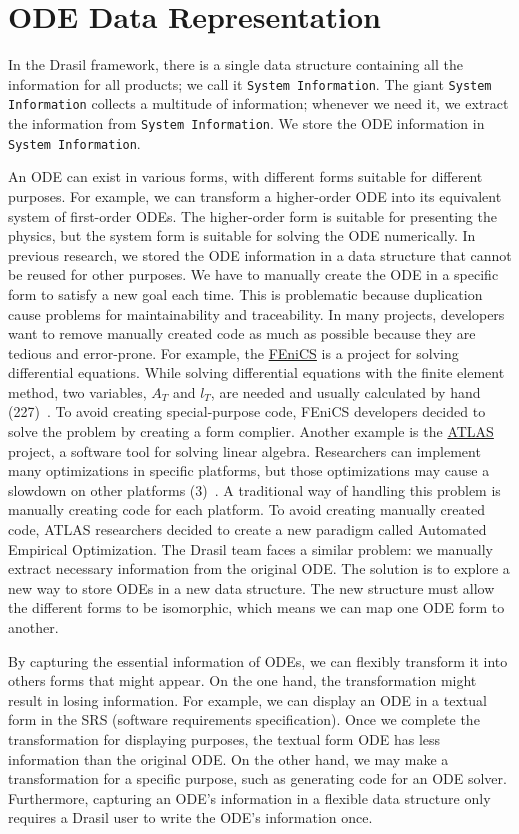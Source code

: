 \chapter{ODE Data Representation}
In the Drasil framework, there is a single data structure containing all the information for all products; we call it \verb|System Information|. The giant \verb|System Information| collects a multitude of information; whenever we need it, we extract the information from \verb|System Information|. We store the ODE information in \verb|System Information|. 

An ODE can exist in various forms, with different forms suitable for different purposes. For example, we can transform a higher-order ODE into its equivalent system of first-order ODEs. The higher-order form is suitable for presenting the physics, but the system form is suitable for solving the ODE numerically. In previous research, we stored the ODE information in a data structure that cannot be reused for other purposes. We have to manually create the ODE in a specific form to satisfy a new goal each time. This is problematic because duplication cause problems for maintainability and traceability. In many projects, developers want to remove manually created code as much as possible because they are tedious and error-prone. For example, the \href{https://fenicsproject.org/}{FEniCS} is a project for solving differential equations. While solving differential equations with the finite element method, two variables, $A_T$ and $l_T$, are needed and usually calculated by hand (227)~\citep{loggetal2012}. To avoid creating special-purpose code, FEniCS developers decided to solve the problem by creating a form complier. Another example is the \href{https://math-atlas.sourceforge.net/}{ATLAS} project, a software tool for solving linear algebra. Researchers can implement many optimizations in specific platforms, but those optimizations may cause a slowdown on other platforms (3)~\citep{whaleyetal2001}. A traditional way of handling this problem is manually creating code for each platform. To avoid creating manually created code, ATLAS researchers decided to create a new paradigm called Automated Empirical Optimization. The Drasil team faces a similar problem: we manually extract necessary information from the original ODE. The solution is to explore a new way to store ODEs in a new data structure. The new structure must allow the different forms to be isomorphic, which means we can map one ODE form to another.

By capturing the essential information of ODEs, we can flexibly transform it into others forms that might appear. On the one hand, the transformation might result in losing information. For example, we can display an ODE in a textual form in the SRS (software requirements specification). Once we complete the transformation for displaying purposes, the textual form ODE has less information than the original ODE. On the other hand, we may make a transformation for a specific purpose, such as generating code for an ODE solver. Furthermore, capturing an ODE's information in a flexible data structure only requires a Drasil user to write the ODE's information once.

